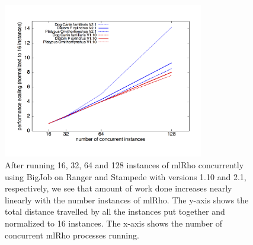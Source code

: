 \documentclass{sig-alternate}
\begin{document}
\begin{figure}[t] %
\centering
\includegraphics[width=0.78\textwidth]{figures/bj-scaling.png}
\caption{After running 16, 32, 64 and 128 instances of mlRho concurrently using BigJob on Ranger and Stampede with versions 1.10 and 2.1, respectively, we see that amount of work done increases nearly linearly with the number instances of mlRho. The y-axis shows the total distance travelled by all the instances put together and normalized to 16 instances. The x-axis shows the number of concurrent mlRho processes running. }
\label{fig:stampede-bench}
\end{figure}

%
%
\end{document}
